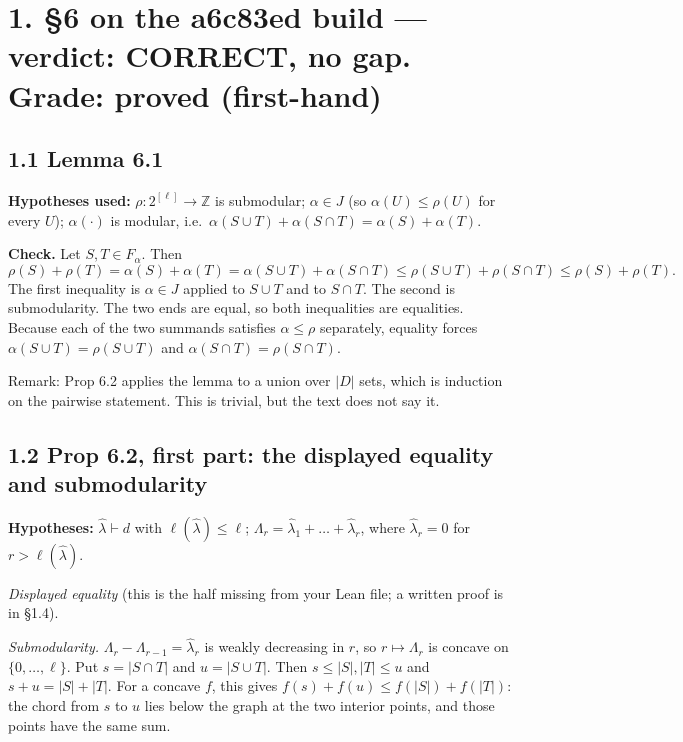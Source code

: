 \documentclass[11pt]{amsart}
\newcommand{\lh}{\hat\lambda}
\newcommand{\Z}{\mathbb{Z}}
\newcommand{\ok}{\ \checkmark}
\begin{document}
\section*{1. \S6 on the a6c83ed build --- verdict: CORRECT, no gap. Grade: \textbf{proved} (first-hand)}

\subsection*{1.1 Lemma 6.1}
\textbf{Hypotheses used:} $\rho: 2^{[\ell]}\to\Z$ is submodular; $\alpha\in J$ (so $\alpha(U)\le\rho(U)$ for every $U$); $\alpha(\cdot)$ is modular, i.e.\ $\alpha(S\cup T)+\alpha(S\cap T)=\alpha(S)+\alpha(T)$.

\smallskip\noindent\textbf{Check.} Let $S,T\in F_\alpha$. Then
\[
\rho(S)+\rho(T)=\alpha(S)+\alpha(T)=\alpha(S\cup T)+\alpha(S\cap T)\le\rho(S\cup T)+\rho(S\cap T)\le\rho(S)+\rho(T).
\]
The first inequality is $\alpha\in J$ applied to $S\cup T$ and to $S\cap T$. The second is submodularity. The two ends are equal, so both inequalities are equalities. Because each of the two summands satisfies $\alpha\le\rho$ separately, equality forces $\alpha(S\cup T)=\rho(S\cup T)$ and $\alpha(S\cap T)=\rho(S\cap T)$.\ok

\smallskip\noindent Remark: Prop 6.2 applies the lemma to a union over $|D|$ sets, which is induction on the pairwise statement. This is trivial, but the text does not say it.

\subsection*{1.2 Prop 6.2, first part: the displayed equality and submodularity}
\textbf{Hypotheses:} $\lh\vdash d$ with $\ell(\lh)\le\ell$; $\Lambda_r=\lh_1+\dots+\lh_r$, where $\lh_r=0$ for $r>\ell(\lh)$.

\smallskip\noindent\emph{Displayed equality} (this is the half missing from your Lean file; a written proof is in \S1.4).\ok

\smallskip\noindent\emph{Submodularity.} $\Lambda_r-\Lambda_{r-1}=\lh_r$ is weakly decreasing in $r$, so $r\mapsto\Lambda_r$ is concave on $\{0,\dots,\ell\}$. Put $s=|S\cap T|$ and $u=|S\cup T|$. Then $s\le|S|,|T|\le u$ and $s+u=|S|+|T|$. For a concave $f$, this gives $f(s)+f(u)\le f(|S|)+f(|T|)$: the chord from $s$ to $u$ lies below the graph at the two interior points, and those points have the same sum.\ok
\end{document}
